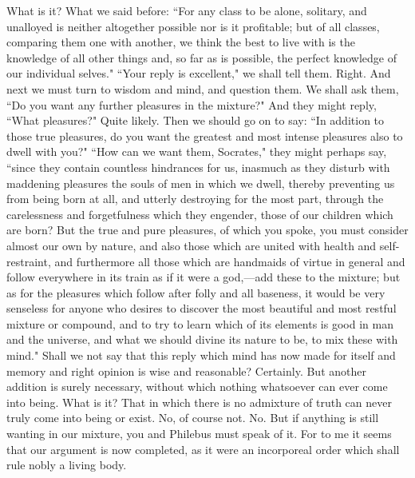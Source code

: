 \documentclass[letterpaper,12pt]{article}
\newcommand{\stephpag}[1]{\marginnote{\small\itshape\fontfamily{ppl}\selectfont #1}}
\begin{document}
\begin{drama}
\protarchusspeaks
What is it?
\socratesspeaks
What we said before: ``For any class to be alone, solitary, and unalloyed is neither altogether possible nor is it profitable; but of all classes, \stephpag{c} comparing them one with another, we think the best to live with is the knowledge of all other things and, so far as is possible, the perfect knowledge of our individual selves."
\protarchusspeaks
``Your reply is excellent," we shall tell them.
\socratesspeaks
Right. And next we must turn to wisdom and mind, and question them. We shall ask them, ``Do you want any further pleasures in the mixture?" And they might reply, ``What pleasures?"
\protarchusspeaks
Quite likely. \stephpag{d}
\socratesspeaks
Then we should go on to say: ``In addition to those true pleasures, do you want the greatest and most intense pleasures also to dwell with you?" ``How can we want them, Socrates," they might perhaps say, ``since they contain countless hindrances for us, inasmuch as they disturb with maddening pleasures the souls of men in which we dwell, thereby preventing us from being born at all, and utterly destroying \stephpag{e} for the most part, through the carelessness and forgetfulness which they engender, those of our children which are born? But the true and pure pleasures, of which you spoke, you must consider almost our own by nature, and also those which are united with health and self-restraint, and furthermore all those which are handmaids of virtue in general and follow everywhere in its train as if it were a god,---add these to the mixture; but as for the pleasures which follow after folly and all baseness, it would be very senseless for anyone who desires to discover the most beautiful and most restful mixture or compound, \stephpag{64 a} and to try to learn which of its elements is good in man and the universe, and what we should divine its nature to be, to mix these with mind." Shall we not say that this reply which mind has now made for itself and memory and right opinion is wise and reasonable?
\protarchusspeaks
Certainly.
\socratesspeaks
But another addition is surely necessary, without which nothing whatsoever can ever come into being. \stephpag{b}
\protarchusspeaks
What is it?
\socratesspeaks
That in which there is no admixture of truth can never truly come into being or exist.
\protarchusspeaks
No, of course not.
\socratesspeaks
No. But if anything is still wanting in our mixture, you and Philebus must speak of it. For to me it seems that our argument is now completed, as it were an incorporeal order which shall rule nobly a living body.
\protarchusspeaks

\end{drama}
\end{document}
